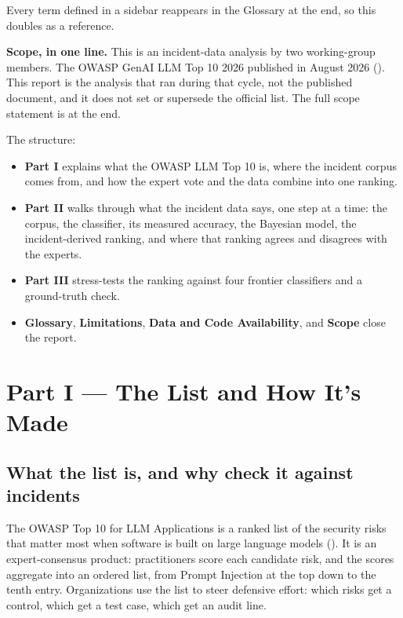 \documentclass[11pt]{article}
\providecommand{\tightlist}{%
  \setlength{\itemsep}{0pt}\setlength{\parskip}{0pt}}
\begin{document}
Every term defined in a sidebar reappears in the Glossary at the end, so
this doubles as a reference.

\textbf{Scope, in one line.} This is an incident-data analysis by two
working-group members. The OWASP GenAI LLM Top 10 2026 published in
August 2026 (). This report is the analysis that ran during that cycle,
not the published document, and it does not set or supersede the
official list. The full scope statement is at the end.

The structure:

\begin{itemize}
\tightlist
\item
  \textbf{Part I} explains what the OWASP LLM Top 10 is, where the
  incident corpus comes from, and how the expert vote and the data
  combine into one ranking.
\item
  \textbf{Part II} walks through what the incident data says, one step
  at a time: the corpus, the classifier, its measured accuracy, the
  Bayesian model, the incident-derived ranking, and where that ranking
  agrees and disagrees with the experts.
\item
  \textbf{Part III} stress-tests the ranking against four frontier
  classifiers and a ground-truth check.
\item
  \textbf{Glossary}, \textbf{Limitations}, \textbf{Data and Code
  Availability}, and \textbf{Scope} close the report.
\end{itemize}

\section{Part I --- The List and How It's
Made}\label{part-i-the-list-and-how-its-made}

\subsection{What the list is, and why check it against
incidents}\label{what-the-list-is-and-why-check-it-against-incidents}

The OWASP Top 10 for LLM Applications is a ranked list of the security
risks that matter most when software is built on large language models
().
It is an expert-consensus product: practitioners score each candidate
risk, and the scores aggregate into an ordered list, from Prompt
Injection at the top down to the tenth entry. Organizations use the list
to steer defensive effort: which risks get a control, which get a test
case, which get an audit line.
\end{document}
